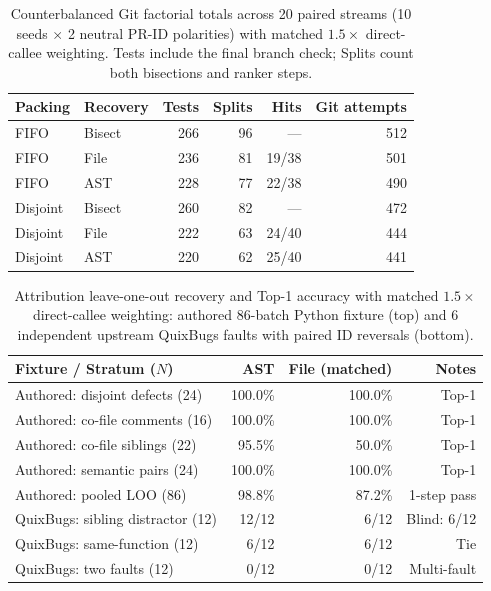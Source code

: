 \begin{table}[t]\centering\scriptsize
\caption{Counterbalanced Git factorial totals across 20 paired streams (10 seeds $\times$ 2 neutral PR-ID polarities) with matched $1.5\times$ direct-callee weighting. Tests include the final branch check; Splits count both bisections and ranker steps.}\label{tab:gitfactorial}
\begin{tabular}{llrrrr}\toprule
Packing & Recovery & Tests & Splits & Hits & Git attempts \\ \midrule
FIFO & Bisect & 266 & 96 & --- & 512 \\
FIFO & File & 236 & 81 & 19/38 & 501 \\
FIFO & AST & 228 & 77 & 22/38 & 490 \\
Disjoint & Bisect & 260 & 82 & --- & 472 \\
Disjoint & File & 222 & 63 & 24/40 & 444 \\
Disjoint & AST & 220 & 62 & 25/40 & 441 \\
\bottomrule\end{tabular}\end{table}
\begin{table}[t]\centering\scriptsize
\caption{Attribution leave-one-out recovery and Top-1 accuracy with matched $1.5\times$ direct-callee weighting: authored 86-batch Python fixture (top) and 6 independent upstream QuixBugs faults with paired ID reversals (bottom).}\label{tab:v7blame}
\setlength{\tabcolsep}{2pt}
\begin{tabular}{lrrr}\toprule
Fixture / Stratum ($N$) & AST & File (matched) & Notes \\ \midrule
Authored: disjoint defects (24) & 100.0\% & 100.0\% & Top-1 \\
Authored: co-file comments (16) & 100.0\% & 100.0\% & Top-1 \\
Authored: co-file siblings (22) & 95.5\% & 50.0\% & Top-1 \\
Authored: semantic pairs (24) & 100.0\% & 100.0\% & Top-1 \\
Authored: pooled LOO (86) & 98.8\% & 87.2\% & 1-step pass \\ \midrule
QuixBugs: sibling distractor (12) & 12/12 & 6/12 & Blind: 6/12 \\
QuixBugs: same-function (12) & 6/12 & 6/12 & Tie \\
QuixBugs: two faults (12) & 0/12 & 0/12 & Multi-fault \\
\bottomrule\end{tabular}\end{table}
